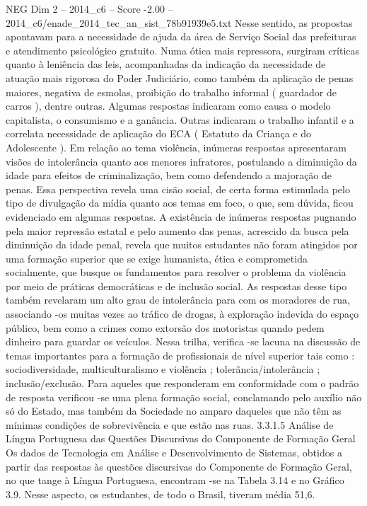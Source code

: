 \begin{textsample}{NEG Dim 2 – 2014\_c6 – Score -2.00 – 2014\_c6/enade\_2014\_tec\_an\_sist\_78b91939e5.txt}
Nesse sentido, as propostas apontavam para a necessidade de ajuda da área de Serviço Social das prefeituras e atendimento psicológico gratuito.
Numa ótica mais repressora, surgiram críticas quanto à leniência das leis, acompanhadas da indicação da necessidade de atuação mais rigorosa do Poder Judiciário, como também da aplicação de penas maiores, negativa de esmolas, proibição do trabalho informal ( guardador de carros ), dentre outras.
Algumas respostas indicaram como causa o modelo capitalista, o consumismo e a ganância.
Outras indicaram o trabalho infantil e a correlata necessidade de aplicação do ECA ( Estatuto da Criança e do Adolescente ).
Em relação ao tema violência, inúmeras respostas apresentaram visões de intolerância quanto aos menores infratores, postulando a diminuição da idade para efeitos de criminalização, bem como defendendo a majoração de penas.
Essa perspectiva revela uma cisão social, de certa forma estimulada pelo tipo de divulgação da mídia quanto aos temas em foco, o que, sem dúvida, ficou evidenciado em algumas respostas.
A existência de inúmeras respostas pugnando pela maior repressão estatal e pelo aumento das penas, acrescido da busca pela diminuição da idade penal, revela que muitos estudantes não foram atingidos por uma formação superior que se exige humanista, ética e comprometida socialmente, que busque os fundamentos para resolver o problema da violência por meio de práticas democráticas e de inclusão social.
As respostas desse tipo também revelaram um alto grau de intolerância para com os moradores de rua, associando -os muitas vezes ao tráfico de drogas, à exploração indevida do espaço público, bem como a crimes como extorsão dos motoristas quando pedem dinheiro para guardar os veículos.
Nessa trilha, verifica -se lacuna na discussão de temas importantes para a formação de profissionais de nível superior tais como : sociodiversidade, multiculturalismo e violência ; tolerância/intolerância ; inclusão/exclusão.
Para aqueles que responderam em conformidade com o padrão de resposta verificou -se uma plena formação social, conclamando pelo auxílio não só do Estado, mas também da Sociedade no amparo daqueles que não têm as mínimas condições de sobrevivência e que estão nas ruas. 3.3.1.5 Análise de Língua Portuguesa das Questões Discursivas do Componente de Formação Geral Os dados de Tecnologia em Análise e Desenvolvimento de Sistemas, obtidos a partir das respostas às questões discursivas do Componente de Formação Geral, no que tange à Língua Portuguesa, encontram -se na Tabela 3.14 e no Gráfico 3.9.
Nesse aspecto, os estudantes, de todo o Brasil, tiveram média 51,6.

\end{textsample}
